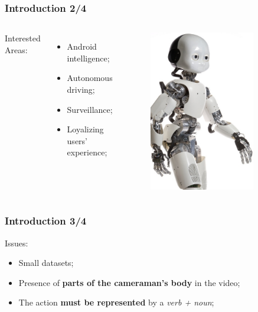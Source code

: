 \documentclass{beamer}
\begin{document}
\begin{frame}
\frametitle{Introduction 2/4}
\begin{columns}
Interested Areas:
\begin{itemize}
\item Android intelligence;
\item Autonomous driving;
\item Surveillance;
\item Loyalizing users' experience;
\end{itemize}
\begin{figure}
\includegraphics[width=0.8\textwidth]{../schemi/icub}
\end{figure}
\end{columns}
\end{frame}

\begin{frame}
\frametitle{Introduction 3/4}
Issues:
\begin{itemize}
\item Small datasets;
\item Presence of \textbf{parts of the cameraman's body} in the video;
\item The action \textbf{must be represented} by a \emph{verb + noun};
\end{itemize}
\end{frame}
\end{document}
